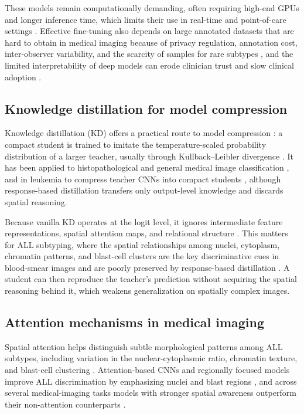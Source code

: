 \documentclass[preprint,review,12pt]{elsarticle}
\begin{document}
These models remain computationally demanding, often requiring high-end
GPUs and longer inference time, which limits their use in real-time and
point-of-care settings \cite{ref6}. Effective fine-tuning also depends on
large annotated datasets that are hard to obtain in medical imaging
because of privacy regulation, annotation cost, inter-observer
variability, and the scarcity of samples for rare subtypes
\cite{ref27,ref28,ref29,ref30}, and the limited interpretability of deep
models can erode clinician trust and slow clinical adoption \cite{ref31}.

\subsection{Knowledge distillation for model compression}

Knowledge distillation (KD) offers a practical route to model
compression \cite{ref8,ref32}: a compact student is trained to imitate
the temperature-scaled probability distribution of a larger teacher,
usually through Kullback--Leibler divergence \cite{ref8}. It has been
applied to histopathological and general medical image classification
\cite{ref33,ref34}, and in leukemia to compress teacher CNNs into compact
students \cite{ref35}, although response-based distillation transfers only
output-level knowledge and discards spatial reasoning.

Because vanilla KD operates at the logit level, it ignores intermediate
feature representations, spatial attention maps, and relational structure
\cite{ref9}. This matters for ALL subtyping, where the spatial
relationships among nuclei, cytoplasm, chromatin patterns, and blast-cell
clusters are the key discriminative cues in blood-smear images and are
poorly preserved by response-based distillation \cite{ref34}. A student
can then reproduce the teacher's prediction without acquiring the spatial
reasoning behind it, which weakens generalization on spatially complex
images.

\subsection{Attention mechanisms in medical imaging}

Spatial attention helps distinguish subtle morphological patterns among
ALL subtypes, including variation in the nuclear-cytoplasmic ratio,
chromatin texture, and blast-cell clustering \cite{ref2,ref36}.
Attention-based CNNs and regionally focused models improve ALL
discrimination by emphasizing nuclei and blast regions
\cite{ref37,ref38,ref39}, and across several medical-imaging tasks models
with stronger spatial awareness outperform their non-attention
counterparts \cite{ref40,ref41}.
\end{document}

